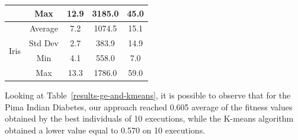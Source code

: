 \documentclass[journal]{IEEEtran}
\begin{document}
\begin{table}[]
\begin{tabular}{|c|c|c|c|c|}
			& Max                                      & 12.9                                                                                          & 3185.0                                                                                                          & 45.0                                                                                                \\ \hline
			\multirow{4}{*}{Iris}                  & Average                                  & 7.2                                                                                           & 1074.5                                                                                                          & 15.1                                                                                                \\ \cline{2-5} 
			& Std Dev                                  & 2.7                                                                                           & 383.9                                                                                                           & 14.9                                                                                                \\ \cline{2-5} 
			& Min                                      & 4.1                                                                                           & 558.0                                                                                                           & 7.0                                                                                                 \\ \cline{2-5} 
			& Max                                      & 13.3                                                                                          & 1786.0                                                                                                          & 59.0                                                                                                \\ \hline
		\end{tabular}
	\end{table}
	
	
	
	Looking at Table~\ref{results-ge-and-kmeans}, it is possible to observe that for the Pima Indian Diabetes, our approach reached 0.605 average of the fitness values obtained by the best individuals of 10 executions, while the K-means algorithm obtained a lower value equal to 0.570 on 10 executions.
	 
\end{document}

